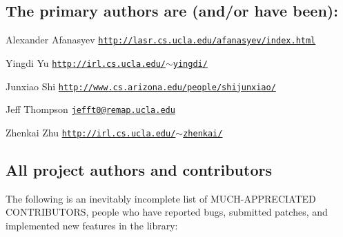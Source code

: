 \subsection*{The primary authors are (and/or have been)\+:}


\begin{DoxyItemize}
\item Alexander Afanasyev \href{http://lasr.cs.ucla.edu/afanasyev/index.html}{\tt http\+://lasr.\+cs.\+ucla.\+edu/afanasyev/index.\+html}
\item Yingdi Yu \href{http://irl.cs.ucla.edu/~yingdi/}{\tt http\+://irl.\+cs.\+ucla.\+edu/$\sim$yingdi/}
\item Junxiao Shi \href{http://www.cs.arizona.edu/people/shijunxiao/}{\tt http\+://www.\+cs.\+arizona.\+edu/people/shijunxiao/}
\item Jeff Thompson \href{mailto:jefft0@remap.ucla.edu}{\tt jefft0@remap.\+ucla.\+edu}
\item Zhenkai Zhu \href{http://irl.cs.ucla.edu/~zhenkai/}{\tt http\+://irl.\+cs.\+ucla.\+edu/$\sim$zhenkai/}
\end{DoxyItemize}

\subsection*{All project authors and contributors}

The following is an inevitably incomplete list of M\+U\+C\+H-\/\+A\+P\+P\+R\+E\+C\+I\+A\+T\+ED C\+O\+N\+T\+R\+I\+B\+U\+T\+O\+RS, people who have reported bugs, submitted patches, and implemented new features in the library\+:


